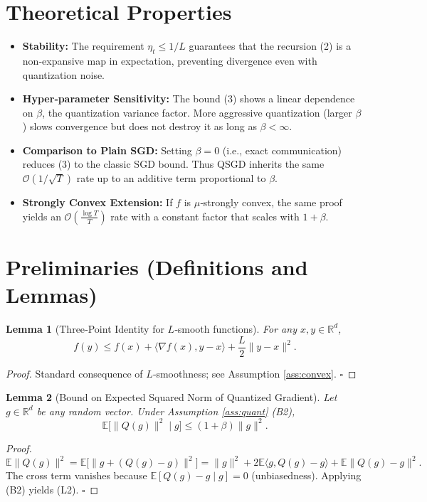 \documentclass{article}
\newcommand{\EE}{\mathbb{E}}
\newcommand{\RR}{\mathbb{R}}
\newtheorem{lemma}{Lemma}
\begin{document}
\section*{Theoretical Properties}
\begin{itemize}
\item \textbf{Stability:} The requirement $\eta_t\le 1/L$ guarantees that the recursion (2) is a non‑expansive map in expectation, preventing divergence even with quantization noise.
\item \textbf{Hyper‑parameter Sensitivity:} The bound (3) shows a linear dependence on $\beta$, the quantization variance factor. More aggressive quantization (larger $\beta$) slows convergence but does not destroy it as long as $\beta<\infty$.
\item \textbf{Comparison to Plain SGD:} Setting $\beta=0$ (i.e., exact communication) reduces (3) to the classic SGD bound. Thus QSGD inherits the same $\mathcal{O}(1/\sqrt{T})$ rate up to an additive term proportional to $\beta$.
\item \textbf{Strongly Convex Extension:} If $f$ is $\mu$‑strongly convex, the same proof yields an $\mathcal{O}(\frac{\log T}{T})$ rate with a constant factor that scales with $1+\beta$.
\end{itemize}

\section*{Preliminaries (Definitions and Lemmas)}
\begin{lemma}[Three‑Point Identity for $L$‑smooth functions]\label{lem:smooth}
For any $x,y\in\RR^{d}$,
\[
f(y)\le f(x)+\langle\nabla f(x),y-x\rangle+\frac{L}{2}\|y-x\|^{2}. \tag{L1}
\]
\end{lemma}
\begin{proof}
Standard consequence of $L$‑smoothness; see Assumption \ref{ass:convex}. \hfill $\square$
\end{proof}

\begin{lemma}[Bound on Expected Squared Norm of Quantized Gradient]\label{lem:quant}
Let $g\in\RR^{d}$ be any random vector. Under Assumption \ref{ass:quant} (B2),
\[
\EE\big[\|Q(g)\|^{2}\mid g\big]\le (1+\beta)\|g\|^{2}. \tag{L2}
\]
\end{lemma}
\begin{proof}
\[
\EE\|Q(g)\|^{2}
=\EE\big[\|g+(Q(g)-g)\|^{2}\big]
=\|g\|^{2}+2\EE\langle g,Q(g)-g\rangle+\EE\|Q(g)-g\|^{2}.
\]
The cross term vanishes because $\EE[Q(g)-g\mid g]=0$ (unbiasedness). Applying (B2) yields (L2). \hfill $\square$
\end{proof}
\end{document}
